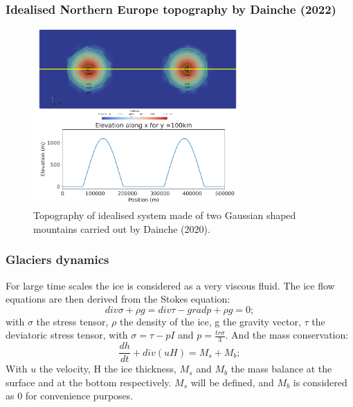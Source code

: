 \documentclass[11pt]{beamer}
\begin{document}
\begin{frame}
	\frametitle{Idealised Northern Europe topography by Dainche (2022)}
			\begin{center}
		\begin{figure}[!h]
			\includegraphics[width=0.7\textwidth]{../fig/Erwan_topography.png} %
			\caption{\footnotesize Topography of idealised system made of two Gaussian shaped mountains carried out by Dainche (2020). }
		\end{figure}
	\end{center}
\end{frame}
\begin{frame}
	\frametitle{Glaciers dynamics}
	For large time scales the ice is considered as a very viscous fluid. The ice flow equations are then derived from the Stokes equation:
	\begin{equation}
		div\sigma + \rho g = div\tau - gradp + \rho g = 0;
	\end{equation}
	with $\sigma$ the stress tensor, $\rho$ the density of the ice, g the gravity vector, $\tau$ the deviatoric stress tensor, with $\sigma = \tau - pI$ and $p=\frac{tr\sigma}{3}$. 
	And the mass conservation:
	\begin{equation}
		\frac{dh}{dt}+ div(uH)=M_s + M_b;
	\end{equation}
	With $u$ the velocity, H the ice thickness, $M_s$ and $M_b$ the mass balance at the surface and at the bottom respectively. $M_s$ will be defined, and $M_b$ is considered as 0 for convenience purposes. 
\end{frame}
\end{document}
